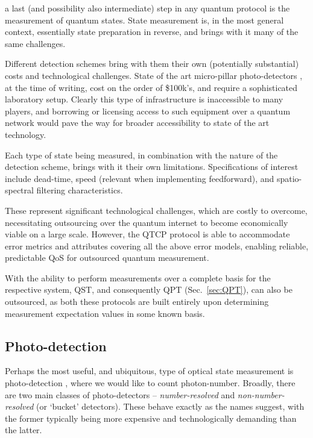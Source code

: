  a last (and possibility also intermediate) step in any quantum protocol is the measurement of quantum states. State measurement is, in the most general context, essentially state preparation in reverse, and brings with it many of the same challenges.

Different detection schemes bring with them their own (potentially substantial) costs and technological challenges. State of the art micro-pillar photo-detectors \cite{???}, at the time of writing, cost on the order of \$100k's, and require a sophisticated laboratory setup. Clearly this type of infrastructure is inaccessible to many players, and borrowing or licensing access to such equipment over a quantum network would pave the way for broader accessibility to state of the art technology.

Each type of state being measured, in combination with the nature of the detection scheme, brings with it their own limitations. Specifications of interest include dead-time, speed (relevant when implementing feedforward), and spatio-spectral filtering characteristics.

These represent significant technological challenges, which are costly to overcome, necessitating outsourcing over the quantum internet to become economically viable on a large scale. However, the QTCP protocol is able to accommodate error metrics and attributes covering all the above error models, enabling reliable, predictable QoS for outsourced quantum measurement.

With the ability to perform measurements over a complete basis for the respective system, QST, and consequently QPT (Sec.~\ref{sec:QPT}), can also be outsourced, as both these protocols are built entirely upon determining measurement expectation values in some known basis.

%
%

\subsection{Photo-detection} \label{sec:photo_detection} 

Perhaps the most useful, and ubiquitous, type of optical state measurement is photo-detection \cite{bib:RohdePDReview}, where we would like to count photon-number. Broadly, there are two main classes of photo-detectors -- \textit{number-resolved} and \textit{non-number-resolved} (or `bucket' detectors). These behave exactly as the names suggest, with the former typically being more expensive and technologically demanding than the latter.


